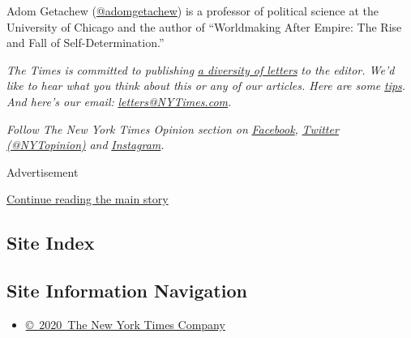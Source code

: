 Adom Getachew (\href{https://twitter.com/adomgetachew}{@adomgetachew})
is a professor of political science at the University of Chicago and the
author of ``Worldmaking After Empire: The Rise and Fall of
Self-Determination.''

\emph{The Times is committed to publishing}
\href{https://www.nytimes3xbfgragh.onion/2019/01/31/opinion/letters/letters-to-editor-new-york-times-women.html}{\emph{a
diversity of letters}} \emph{to the editor. We'd like to hear what you
think about this or any of our articles. Here are some}
\href{https://help.nytimes3xbfgragh.onion/hc/en-us/articles/115014925288-How-to-submit-a-letter-to-the-editor}{\emph{tips}}\emph{.
And here's our email:}
\href{mailto:letters@NYTimes.com}{\emph{letters@NYTimes.com}}\emph{.}

\emph{Follow The New York Times Opinion section on}
\href{https://www.facebookcorewwwi.onion/nytopinion}{\emph{Facebook}}\emph{,}
\href{http://twitter.com/NYTOpinion}{\emph{Twitter (@NYTopinion)}}
\emph{and}
\href{https://www.instagram.com/nytopinion/}{\emph{Instagram}}\emph{.}

Advertisement

\protect\hyperlink{after-bottom}{Continue reading the main story}

\hypertarget{site-index}{%
\subsection{Site Index}\label{site-index}}

\hypertarget{site-information-navigation}{%
\subsection{Site Information
Navigation}\label{site-information-navigation}}

\begin{itemize}
\tightlist
\item
  \href{https://help.nytimes3xbfgragh.onion/hc/en-us/articles/115014792127-Copyright-notice}{©~2020~The
  New York Times Company}
\end{itemize}

